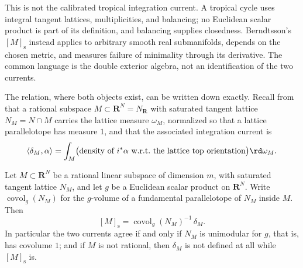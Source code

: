 This is not the calibrated tropical integration current.  A tropical cycle
uses integral tangent lattices, multiplicities, and balancing; no Euclidean
scalar product is part of its definition, and balancing supplies closedness.
Berndtsson's $[M]_{\mathrm s}$ instead applies to arbitrary smooth real
submanifolds, depends on the chosen metric, and measures failure of
minimality through its derivative.  The common language is the double
exterior algebra, not an identification of the two currents.

The relation, where both objects exist, can be written down exactly.  Recall
from  that a rational subspace
$M\subset\mathbf R^N=N_{\mathbf R}$ with saturated tangent lattice
$N_M=N\cap M$ carries the lattice measure $\omega_M$, normalized so that a
lattice parallelotope has measure $1$, and that the associated integration
current is
\[
 \langle\delta_M,\alpha\rangle
 =\int_M\bigl(\text{density of }i^*\alpha
   \text{ w.r.t.\ the lattice top orientation}\bigr)\rd\omega_M .
\]

\begin{proposition}
\label{prop:ch14-berndtsson-vs-tropical}
Let $M\subset\mathbf R^N$ be a rational linear subspace of dimension $m$,
with saturated tangent lattice $N_M$, and let $g$ be a Euclidean scalar
product on $\mathbf R^N$.  Write
$\operatorname{covol}_g(N_M)$ for the $g$-volume of a fundamental
parallelotope of $N_M$ inside $M$.  Then
\[
 [M]_{\mathrm s}=\operatorname{covol}_g(N_M)^{-1}\,\delta_M .
\]
In particular the two currents agree if and only if $N_M$ is unimodular for
$g$, that is, has covolume $1$; and if $M$ is not rational, then $\delta_M$
is not defined at all while $[M]_{\mathrm s}$ is.
\end{proposition}

